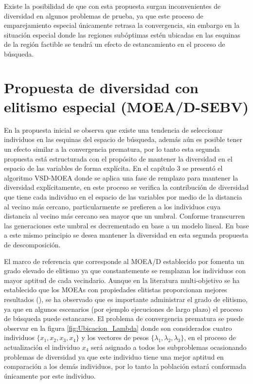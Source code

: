 Existe la posibilidad de que con esta propuesta surgan inconvenientes de diversidad en algunos problemas de prueba, ya que este proceso de emparejamiento especial únicamente retrasa la convergencia, sin embargo en la situación especial donde las regiones subóptimas estén ubicadas en las esquinas de la región factible se tendrá un efecto de estancamiento en el proceso de búsqueda.

\section{Propuesta de diversidad con elitismo especial (MOEA/D-SEBV)}

En la propuesta inicial se observa que existe una tendencia de seleccionar individuos en las esquinas del espacio de búsqueda, además aún es posible tener un efecto similar a la convergencia prematura, por lo tanto esta segunda propuesta está estructurada con el propósito de mantener la diversidad en el espacio de las variables de forma explícita.
%
En el capítulo 3 se presentó el algoritmo VSD-MOEA donde se aplica una fase de remplazo para mantener la diversidad explícitamente, en este proceso se verifica la contribución de diversidad que tiene cada individuo en el espacio de las variables por medio de la distancia al vecino más cercano, particularmente se prefieren a los individuos cuya distancia al vecino más cercano sea mayor que un umbral.
%
Conforme transcurren las generaciones este umbral es decrementado en base a un modelo lineal.
%
En base a este mismo principio se desea mantener la diversidad en esta segunda propuesta de descomposición.


El marco de referencia que corresponde al MOEA/D establecido por \citeauthor{Joel:MOEAD} fomenta un grado elevado de elitismo ya que constantemente se remplazan los individuos con mayor aptitud de cada vecindario.
%
Aunque en la literatura multi-objetivo se ha establecido que los MOEAs con propiedades elitistas proporcionan mejores resultados (\cite{Joel:Kalyanmoy}), se ha observado que es importante administrar el grado de elitismo, ya que en algunos escenarios (por ejemplo ejecuciones de largo plazo) el proceso de búsqueda puede estancarse.
%
El problema de convergencia prematura se puede observar en la figura \ref{fig:Ubicacion_Lambda} donde son considerados cuatro individuos $\{x_1, x_2, x_3, x_4\}$ y los vectores de pesos $\{ \lambda_1, \lambda_2, \lambda_3 \}$, en el proceso de actualización el individuo $x_4$ será asignado a todos los subproblemas ocasionando problemas de diversidad ya que este individuo tiene una mejor aptitud en comparación a los demás individuos, por lo tanto la población estará conformada únicamente por este individuo.
%

